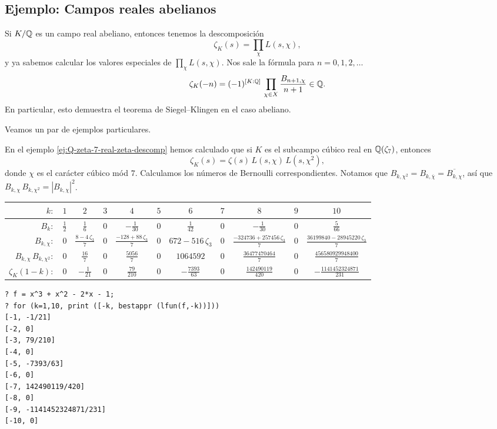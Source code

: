 \subsection{Ejemplo: Campos reales abelianos}

Si $K/\mathbb{Q}$ es un campo real abeliano, entonces tenemos la descomposición
$$\zeta_K (s) = \prod_\chi L (s,\chi),$$
y ya sabemos calcular los valores especiales de $\prod_\chi L (s,\chi)$.
Nos sale la fórmula para $n = 0,1,2,\ldots$
$$\zeta_K (-n) = (-1)^{[K:\mathbb{Q}]}\,\prod_{\chi\in X} \frac{B_{n+1,\chi}}{n+1} \in \mathbb{Q}.$$
En particular, esto demuestra el teorema de Siegel--Klingen en el caso abeliano.

Veamos un par de ejemplos particulares.

\begin{ejemplo}
  En el ejemplo \ref{ej:Q-zeta-7-real-zeta-descomp} hemos calculado que si $K$
  es el subcampo cúbico real en $\mathbb{Q} (\zeta_7)$, entonces
  $$\zeta_K (s) = \zeta (s) \, L (s,\chi) \, L (s,\chi^2),$$
  donde $\chi$ es el carácter cúbico mód $7$. Calculamos los números de
  Bernoulli correspondientes. Notamos que
  $B_{k,\chi^2} = B_{k,\overline{\chi}} = \overline{B_{k,\chi}}$, así que
  $B_{k,\chi}\,B_{k,\chi^2} = |B_{k,\chi}|^2$.

  \begin{center}
    \renewcommand{\arraystretch}{1.5}
    \begin{tabular}{rcccccccccc}
      \hline
      $k\colon$ & $1$ & $2$ & $3$ & $4$ & $5$ & $6$ & $7$ & $8$ & $9$ & $10$ \\
      \hline
      $B_k\colon$ & $\frac{1}{2}$ & $\frac{1}{6}$ & $0$ & $-\frac{1}{30}$ & $0$ & $\frac{1}{42}$ & $0$ & $-\frac{1}{30}$ & $0$ & $\frac{5}{66}$ \\
      \hline
      $B_{k,\chi}\colon$ & $0$ & $\frac{8-4\,\zeta_3}{7}$ & $0$ & $\frac{-128 + 88\,\zeta_3}{7}$ & $0$ & $672 - 516\,\zeta_3$ & $0$ & $\frac{-324736 + 257456\,\zeta_3}{7}$ & $0$ & $\frac{36199840 - 28945220\,\zeta_3}{7}$ \\
      \hline
      $B_{k,\chi}\,B_{k,\chi^2}\colon$ & $0$ & $\frac{16}{7}$ & $0$ & $\frac{5056}{7}$ & $0$ & $1064592$ & $0$ & $\frac{36477470464}{7}$ & $0$ & $\frac{456580929948400}{7}$ \\
      \hline
      $\zeta_K (1-k)\colon$ & $0$ & $-\frac{1}{21}$ & $0$ & $\frac{79}{210}$ & $0$ & $-\frac{7393}{63}$ & $0$ & $\frac{142490119}{420}$ & $0$ & $-\frac{1141452324871}{231}$ \\
      \hline
    \end{tabular}
  \end{center}

  \begin{shaded}
\begin{verbatim}
? f = x^3 + x^2 - 2*x - 1;
? for (k=1,10, print ([-k, bestappr (lfun(f,-k))]))
[-1, -1/21]
[-2, 0]
[-3, 79/210]
[-4, 0]
[-5, -7393/63]
[-6, 0]
[-7, 142490119/420]
[-8, 0]
[-9, -1141452324871/231]
[-10, 0]
\end{verbatim}
\end{shaded}
\end{ejemplo}

